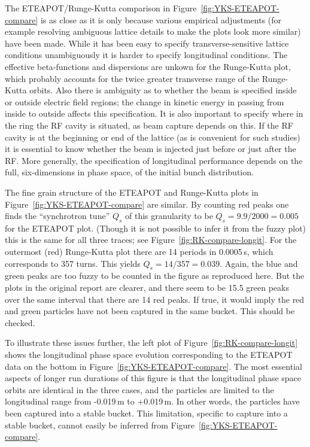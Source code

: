 \documentclass[12]{article}
\begin{document}
The ETEAPOT/Runge-Kutta comparison in Figure~\ref{fig:YKS-ETEAPOT-compare}
is as close as it is only because various empirical adjustments
(for example resolving ambiguous lattice details to make the plots look
more similar) have been made. While it has been easy to specify 
transverse-sensitive lattice 
conditions unambiguously it is harder to specify longitudinal
conditions. The effective beta-functions and dispersions are unkown
for the Runge-Kutta plot, which probably accounts for the twice greater
transverse range of the Runge-Kutta orbits. Also 
there is ambiguity as to whether the beam is specified 
inside or outside electric field regions; the change in kinetic
energy in passing from inside to outside affects this specification.
It is also important to specify where in the ring the RF cavity is
situated, as beam capture depends on this. If the RF cavity is
at the beginning or end of the lattice (as is convenient for such studies) 
it is essential to know whether the beam is injected just before or
just after the RF. More generally, the specification of longitudinal
performance depends on the full, six-dimensions in phase space,
of the initial bunch distribution.

The fine grain structure of the ETEAPOT and Runge-Kutta plots in
Figure~\ref{fig:YKS-ETEAPOT-compare} are similar. By counting red peaks one
finds the ``synchrotron tune'' $Q_s$ of this granularity to be 
$Q_s=9.9/2000=0.005$ for the ETEAPOT plot. (Though it is not possible to infer 
it from the fuzzy plot) this is the same for all three traces; 
see Figure~\ref{fig:RK-compare-longit}. For the outermost
(red) Runge-Kutta plot there are 14 periods in 0.0005\,s, which corresponds to
357 turns. This yields $Q_s=14/357=0.039$. Again, the blue and green peaks
are too fuzzy to be counted in the figure as reproduced here. But the
plots in the original report\cite{YKS-tracking} are clearer, and there
seem to be 15.5 green peaks over the same interval that there are 14
red peaks. If true, it would imply the red and green particles have not
been captured in the same bucket. This should be checked. 

To illustrate these issues further, the left plot of 
Figure~\ref{fig:RK-compare-longit}
shows the longitudinal phase space evolution corresponding 
to the ETEAPOT data on the bottom in 
Figure~\ref{fig:YKS-ETEAPOT-compare}. The most essential aspects of
longer run durations of this
figure is that the longitudinal phase space orbits are identical
in the three cases, and the particles are limited to the longitudinal
range from -0.019\,m to +0.019\,m. In other words, the particles have
been captured into a stable bucket. This limitation, specific to capture
into a stable bucket, cannot easily be inferred from 
Figure~\ref{fig:YKS-ETEAPOT-compare}. 
\end{document}
